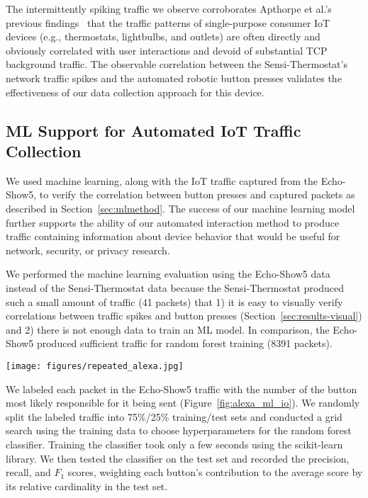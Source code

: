 The intermittently spiking traffic we observe corroborates  Apthorpe et al.'s previous findings~\cite{apthorpe2019keeping} that the traffic patterns of single-purpose consumer IoT devices (e.g., thermostats, lightbulbs, and outlets) are often directly and obviously correlated with user interactions and devoid of substantial TCP background traffic.
The observable correlation between the Sensi-Thermostat's network traffic spikes and the automated robotic button presses validates the effectiveness of our data collection approach for this device. 

\subsection{ML Support for Automated IoT Traffic Collection}
We used machine learning, along with the IoT traffic captured from the Echo-Show5, to verify the correlation between button presses and captured packets as described in Section~\ref{sec:mlmethod}. The success of our machine learning model further supports the ability of our automated interaction method to produce traffic containing information about device behavior that would be useful for network, security, or privacy research.

We performed the machine learning evaluation using the Echo-Show5 data instead of the Sensi-Thermostat data because the Sensi-Thermostat produced such a small amount of traffic (41 packets) that 1) it is easy to visually verify correlations between traffic spikes and button presses (Section~\ref{sec:results-visual}) and 2) there is not enough data to train an ML model. 
In comparison, the Echo-Show5 produced sufficient traffic for random forest training (8391 packets). 

\begin{figure*}[t]
    \centering
    \texttt{[image: figures/repeated\_alexa.jpg]}
    \caption{Example Echo-Show5 TCP traffic with labeled button presses. This trace was collected with 15 presses of each of 4 physical buttons on the device and 10 seconds between each button press. The trace contains 8391 total packets.}
    \label{fig:alexa_ml_io}
\end{figure*}

We labeled each packet in the Echo-Show5 traffic with the number of the button most likely responsible for it being sent (Figure~\ref{fig:alexa_ml_io}). We randomly split the labeled traffic into 75\%/25\% training/test sets and conducted a grid search using the training data to choose hyperparameters for the random forest classifier. 
Training the classifier took only a few seconds using the scikit-learn library. 
We then tested the classifier on the test set and recorded the precision, recall, and $F_1$ scores, weighting each button's contribution to the average score by its relative cardinality in the test set. 

